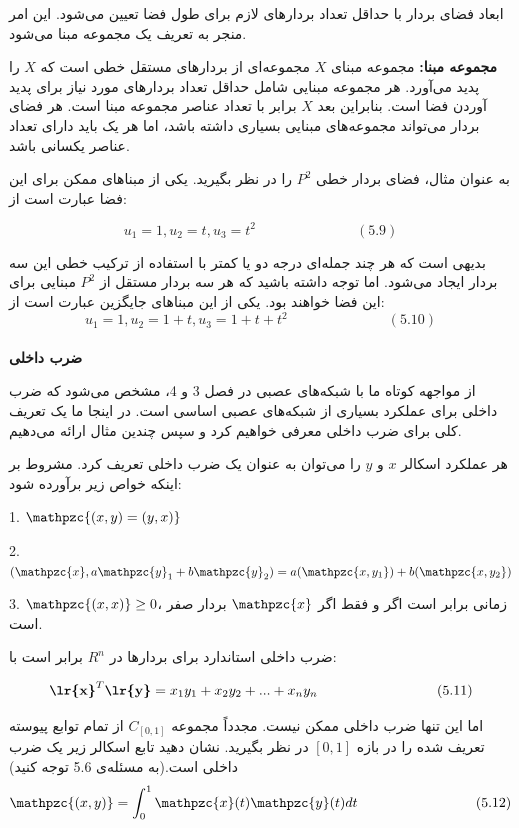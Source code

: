 \documentclass[a4paper,12pt]{report}
\begin{document}
	ابعاد فضای بردار با حداقل تعداد بردارهای لازم برای طول فضا تعیین می‌شود. این امر منجر به تعریف یک مجموعه مبنا می‌شود.
	
	\textbf{مجموعه مبنا: }مجموعه مبنای $ X $ مجموعه‌ای از بردارهای مستقل خطی است که $ X $ را پدید می‌آورد. هر مجموعه مبنایی شامل حداقل تعداد بردارهای مورد نیاز برای پدید آوردن فضا است.
	بنابراین بعد $ X $ برابر با تعداد عناصر مجموعه مبنا است. هر فضای بردار می‌تواند مجموعه‌های مبنایی بسیاری داشته باشد، اما هر یک باید دارای تعداد عناصر یکسانی باشد.
	
	به عنوان مثال، فضای بردار خطی $ P^2 $ را در نظر بگیرید. یکی از مبناهای ممکن برای این فضا عبارت است از:
	
	$$
	u_1=1 , u_2=t , u_3=t^2 \hspace{3cm} (5.9)
	$$
	
	بدیهی است که هر چند جمله‌ای درجه دو یا کمتر با استفاده از ترکیب خطی این سه بردار ایجاد می‌شود. اما توجه داشته باشید که هر سه بردار مستقل از $ P^2 $ مبنایی برای این فضا خواهند بود. یکی از این مبناهای جایگزین عبارت است از:
	$$
	u_1=1 , u_2=1+t , u_3=1+t+t^2 \hspace{3cm} (5.10)
	$$\\
	
	\noindent\textbf{\Large{ضرب داخلی}}	
	
	از مواجهه کوتاه ما با شبکه‌های عصبی در فصل 3 و 4، مشخص می‌شود که ضرب داخلی برای عملکرد بسیاری از شبکه‌های عصبی اساسی است. در اینجا ما یک تعریف کلی برای ضرب داخلی معرفی خواهیم کرد و سپس چندین مثال ارائه می‌دهیم.
	
	هر عملکرد اسکالر $ x $ و $ y $ را می‌توان به عنوان یک ضرب داخلی تعریف کرد. مشروط بر اینکه خواص زیر برآورده شود:

	1. $ \mathpzc{(x,y)=(y,x)} $
	
	2. $ (\mathpzc{x},a\mathpzc{y}_1+b\mathpzc{y}_2)=a(\mathpzc{x,y_1})+b(\mathpzc{x,y_2}) $

	3. $ \mathpzc{(x,x)} \geq 0 $،
	 زمانی برابر است اگر و فقط اگر $ \mathpzc{x} $ بردار صفر است.
	
	ضرب داخلی استاندارد برای بردارها در $ R^n $ برابر است با:

	$$
	\textbf{\lr{x}}^T\textbf{\lr{y}}=x_1y_1+x_2y_2+...+x_ny_n \hspace{3cm} (5.11)
	$$
	
	اما این تنها ضرب داخلی ممکن نیست. مجدداً مجموعه $ C_{[0,1]} $ از تمام توابع پیوسته تعریف شده را در بازه $ [0 , 1] $ در نظر بگیرید. نشان دهید تابع اسکالر زیر یک ضرب داخلی است.(به مسئله‌ی 5.6 توجه کنید)
	$$
	\mathpzc{(x,y)}=\int_{0}^{1}\mathpzc{x}(t)\mathpzc{y}(t)dt \hspace{3cm} (5.12)
	$$
	
\end{document}
